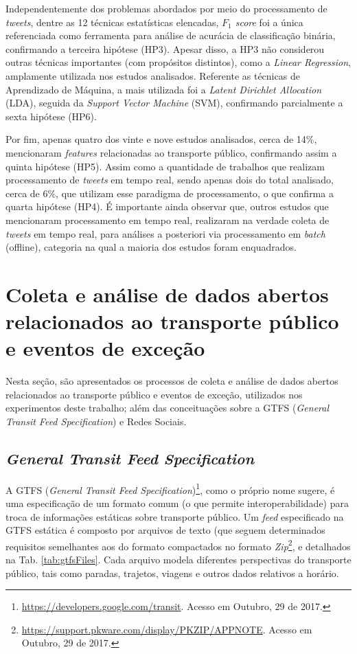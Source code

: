 \documentclass[
	12pt,				%
	oneside,			%
	a4paper,			%
	english,			%
	brazil				%
	]{abntex2ppgsi}
\begin{document}
{{Independentemente dos problemas abordados por meio do processamento de \textit{tweets}, dentre as 12 técnicas estatísticas elencadas, \textit{${F_1}$ score} foi a única referenciada como ferramenta para análise de acurácia de classificação binária, confirmando a terceira hipótese (HP3). Apesar disso, a HP3 não considerou outras técnicas importantes (com propósitos distintos), como a \textit{Linear Regression}, amplamente utilizada nos estudos analisados. Referente as técnicas de Aprendizado de Máquina, a mais utilizada foi a \textit{Latent Dirichlet Allocation} (LDA), seguida da \textit{Support Vector Machine} (SVM), confirmando parcialmente a sexta hipótese (HP6).

Por fim, apenas quatro dos vinte e nove estudos analisados, cerca de 14\%, mencionaram \textit{features} relacionadas ao transporte público, confirmando assim a quinta hipótese (HP5). Assim como a quantidade de trabalhos que realizam processamento de \textit{tweets} em tempo real, sendo apenas dois do total analisado, cerca de 6\%, que utilizam esse paradigma de processamento, o que confirma a quarta hipótese (HP4). É importante ainda observar que, outros estudos que mencionaram processamento em tempo real, realizaram na verdade coleta de \textit{tweets} em tempo real, para análises a posteriori via processamento em \textit{batch} (offline), categoria na qual a maioria dos estudos foram enquadrados.

\chapter{Coleta e análise de dados abertos relacionados ao transporte público e eventos de exceção}
\label{dataSet}

Nesta seção, são apresentados os processos de coleta e análise de dados abertos relacionados ao transporte público e eventos de exceção, utilizados nos experimentos deste trabalho; além das conceituações sobre a GTFS (\textit{General Transit Feed Specification}) e Redes Sociais.

\section{\textit{General Transit Feed Specification}}
\label{gtfs}

A GTFS (\textit{General Transit Feed Specification})\footnote{\label{googleTransit}\url{https://developers.google.com/transit}. Acesso em Outubro, 29 de 2017.}, como o próprio nome sugere, é uma especificação de um formato comum (o que permite interoperabilidade) para troca de informações estáticas sobre transporte público.  Um \textit{feed} especificado na GTFS estática é composto por arquivos de texto (que seguem determinados requisitos semelhantes aos do formato   compactados no formato \textit{Zip}\footnote{\url{https://support.pkware.com/display/PKZIP/APPNOTE}. Acesso em Outubro, 29 de 2017.}, e detalhados na Tab. \ref{tab:gtfsFiles}. Cada arquivo modela diferentes perspectivas do transporte público, tais como paradas, trajetos, viagens e outros dados relativos a horário.

}}
\end{document}
